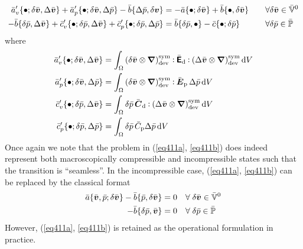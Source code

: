 \documentclass[10pt,a4paper]{article}
\newcommand{\ded}{\mathrm{d}}
\newcommand{\dep}{\mathrm{p}}
\begin{document}
\begin{align}
 \bar{a}'_v\{\bullet; \delta\bar{\boldsymbol{v}},\Delta\bar{\boldsymbol{v}}\} + \bar{a}'_p\{\bullet; \delta\bar{\boldsymbol{v}},\Delta\bar{p}\} - \bar{b}\{\Delta\bar p, \delta{\boldsymbol{v}}\}
	  &= -\bar{a}\{\bullet; \delta\bar{\boldsymbol{v}}\} + \bar{b}\{\bullet, \delta\bar{\boldsymbol{v}}\}
\quad &&\forall \delta\bar{\boldsymbol{v}}\in \bar{\mathbb{V}}^0
 \label{eq414a}\\
- \bar{b}\{\delta\bar p, \Delta\bar{\boldsymbol{v}}\} + \bar{c}'_v\{\bullet; \delta\bar{p}, \Delta\bar{ \boldsymbol{v}}\} + \bar{c}'_p\{\bullet; \delta\bar{p},\Delta\bar{p}\}
	  &= \bar{b}\{\delta\bar{p},\bullet\} - \bar{c}\{\bullet;\delta\bar{p}\}
\quad &&\forall \delta\bar{p} \in \bar{\mathbb{P}}
 \label{eq414b}
\end{align}
where
\begin{align}
 \bar{a}'_v\{\bullet; \delta\bar{\ta v},\Delta\bar{\ta v}\} &= \int_\Omega \left(\delta\bar{\ta v}\outerp\diff\right)^\sym_\dev \dprod \bar{\tf{E}}_\ded \dprod \left(\Delta\bar{\ta v}\outerp\diff\right)^\sym_\dev \dif V
 \label{eq415a}\\
 \bar{a}'_p\{\bullet; \delta\bar{\ta v},\Delta\bar{p}\}     &= \int_\Omega \left(\delta\bar{\ta v}\outerp\diff\right)^\sym_\dev \dprod \bar{\ts E}_\dep \,\Delta\bar{p} \dif V
 \label{eq415b}\\
 \bar{c}'_v\{\bullet; \delta\bar{p}, \Delta\bar{ \ta v}\}   &= \int_\Omega \delta\bar{p} \,\bar{\ts C}_\ded \dprod \left(\Delta\bar{\ta v}\outerp\diff\right)^\sym_\dev \dif V
 \label{eq415c}\\
 \bar{c}'_p\{\bullet; \delta\bar{p},\Delta\bar{p}\}         &= \int_\Omega \delta\bar{p} \,\bar{C}_\dep \Delta\bar p\dif V
 \label{eq415d}
\end{align}
Once again we note that the problem in (\ref{eq411a}, \ref{eq411b}) does indeed represent both macroscopically compressible and incompressible states such that the transition is ``seamless''.
In the incompressible case, (\ref{eq411a}, \ref{eq411b}) can be replaced by the classical format
\begin{align}
 \bar a\{\bar{\boldsymbol{v}},\bar p; \delta\bar{\boldsymbol{v}}\} - \bar b\{\bar p, \delta\bar{\boldsymbol{v}}\} &= 0   \quad \forall\; \delta\bar{\boldsymbol{v}} \in \bar{\mathbb{V}}^0
 \label{eq420a}\\
 - \bar b\{\delta\bar p, \bar{\boldsymbol{v}}\} &= 0   \quad \forall\; \delta\bar p \in \bar{\mathbb{P}}
 \label{eq420b}
\end{align}
However, (\ref{eq411a}, \ref{eq411b}) is retained as the operational formulation in practice.
\end{document}
